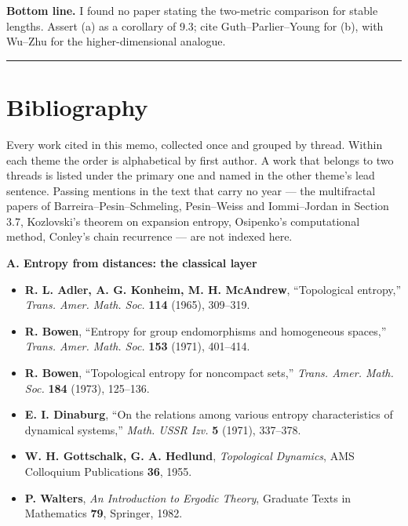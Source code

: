 \documentclass[
]{article}
\providecommand{\tightlist}{%
  \setlength{\itemsep}{0pt}\setlength{\parskip}{0pt}}
\begin{document}
\textbf{Bottom line.} I found no paper stating the two-metric comparison
for stable lengths. Assert (a) as a corollary of 9.3; cite
Guth--Parlier--Young for (b), with Wu--Zhu for the higher-dimensional
analogue.

\begin{center}\rule{0.5\linewidth}{0.5pt}\end{center}

\section{Bibliography}\label{bibliography}

Every work cited in this memo, collected once and grouped by thread.
Within each theme the order is alphabetical by first author. A work that
belongs to two threads is listed under the primary one and named in the
other theme's lead sentence. Passing mentions in the text that carry no
year --- the multifractal papers of Barreira--Pesin--Schmeling,
Pesin--Weiss and Iommi--Jordan in Section 3.7, Kozlovski's theorem on expansion
entropy, Osipenko's computational method, Conley's chain recurrence ---
are not indexed here.

\textbf{A. Entropy from distances: the classical layer}

\begin{itemize}
\tightlist
\item
  \textbf{R. L. Adler, A. G. Konheim, M. H. McAndrew}, ``Topological
  entropy,'' \emph{Trans. Amer. Math. Soc.} \textbf{114} (1965),
  309--319.
\item
  \textbf{R. Bowen}, ``Entropy for group endomorphisms and homogeneous
  spaces,'' \emph{Trans. Amer. Math. Soc.} \textbf{153} (1971),
  401--414.
\item
  \textbf{R. Bowen}, ``Topological entropy for noncompact sets,''
  \emph{Trans. Amer. Math. Soc.} \textbf{184} (1973), 125--136.
\item
  \textbf{E. I. Dinaburg}, ``On the relations among various entropy
  characteristics of dynamical systems,'' \emph{Math. USSR Izv.}
  \textbf{5} (1971), 337--378.
\item
  \textbf{W. H. Gottschalk, G. A. Hedlund}, \emph{Topological Dynamics},
  AMS Colloquium Publications \textbf{36}, 1955.
\item
  \textbf{P. Walters}, \emph{An Introduction to Ergodic Theory},
  Graduate Texts in Mathematics \textbf{79}, Springer, 1982.
\end{itemize}
\end{document}
